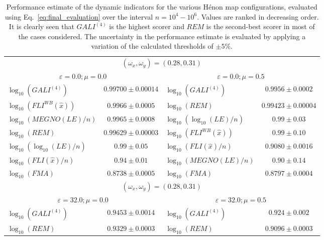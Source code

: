 \begin{table}[htb]
    \centering
    \caption{Performance estimate of the dynamic indicators for the various Hénon map configurations, evaluated using Eq.~\eqref{eq:final_evaluation} over the interval $n=10^4-10^6$. Values are ranked in decreasing order. It is clearly seen that $GALI^{(4)}$ is the highest scorer and $REM$ is the second-best scorer in most of the cases considered. The uncertainty in the performance estimate is evaluated by applying a variation of the calculated thresholds of $\pm 5\%$.}
    \begin{adjustbox}{width=\textwidth,center}
    \begin{tabular}{lc|lc}
        \hline
        \multicolumn{4}{c}{$(\omega_x, \omega_y) = (0.28, 0.31)$} \\
         \multicolumn{2}{c|}{$\varepsilon = 0.0; \mu = 0.0$} & \multicolumn{2}{c}{$\varepsilon = 0.0; \mu = 0.5$} \\
        \hline
        $\log_{{10}}(GALI^{{(4)}})$ & $0.99700 \pm 0.00014$ & $\log_{{10}}(GALI^{{(4)}})$ & $0.9956 \pm 0.0002$ \\ 
        $\log_{{10}}(FLI^{{WB}}(\hat{{x}}))$ & $0.9966 \pm 0.0005$ & $\log_{{10}}(REM)$ & $0.99423 \pm 0.00004$ \\ 
        $\log_{{10}}(MEGNO(LE)/n)$ & $0.9965 \pm 0.0008$ & $\log_{{10}}(\log_{{10}}(LE)/n)$ & $0.99 \pm 0.03$ \\ 
        $\log_{{10}}(REM)$ & $0.99629 \pm 0.00003$ & $\log_{{10}}(FLI^{{WB}}(\hat{{x}}))$ & $0.99 \pm 0.10$ \\ 
        $\log_{{10}}(\log_{{10}}(LE)/n)$ & $0.99 \pm 0.05$ & $\log_{{10}}(FLI(\hat{{x}})/n)$ & $0.9080 \pm 0.0016$ \\ 
        $\log_{{10}}(FLI(\hat{{x}})/n)$ & $0.94 \pm 0.01$ & $\log_{{10}}(MEGNO(LE)/n)$ & $0.90 \pm 0.14$ \\ 
        $\log_{{10}}(FMA)$ & $0.8738 \pm 0.0005$ & $\log_{{10}}(FMA)$ & $0.8797 \pm 0.0004$ \\ 
        \hline
        \multicolumn{4}{c}{$(\omega_x, \omega_y) = (0.28, 0.31)$} \\
         \multicolumn{2}{c|}{$\varepsilon = 32.0; \mu = 0.0$} & \multicolumn{2}{c}{$\varepsilon = 32.0; \mu = 0.5$} \\
        \hline
        $\log_{{10}}(GALI^{{(4)}})$ & $0.9453 \pm 0.0014$ & $\log_{{10}}(GALI^{{(4)}})$ & $0.924 \pm 0.002$ \\ 
        $\log_{{10}}(REM)$ & $0.9329 \pm 0.0003$ & $\log_{{10}}(REM)$ & $0.9096 \pm 0.0003$ \\ 

\end{tabular}
\end{adjustbox}
\end{table}

